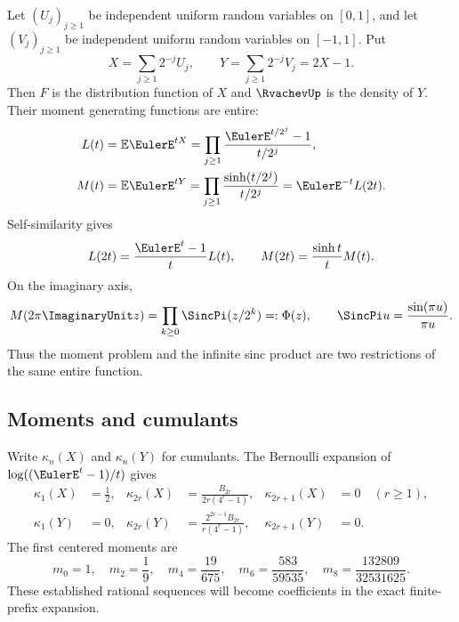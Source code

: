 \documentclass[11pt,oneside]{article}
\numberwithin{equation}{section}
\theoremstyle{definition}
\theoremstyle{remark}
\begin{document}
Let $(U_j)_{j\ge1}$ be independent uniform random variables on $[0,1]$, and let
$(V_j)_{j\ge1}$ be independent uniform random variables on $[-1,1]$.  Put
\begin{equation}
 X=\sum_{j\ge1}2^{-j}U_j,
 \qquad
 Y=\sum_{j\ge1}2^{-j}V_j=2X-1.
 \label{p2:eq:XY-series}
\end{equation}
Then $F$ is the distribution function of $X$ and $\RvachevUp$ is the density of $Y$.  Their moment
generating functions are entire:
\begin{align}
 L(t)&=\mathbb E\EulerE^{tX}
 =\prod_{j\ge1}\frac{\EulerE^{t/2^j}-1}{t/2^j},
 \label{p2:eq:L-def}\\
 M(t)&=\mathbb E\EulerE^{tY}
 =\prod_{j\ge1}\frac{\sinh(t/2^j)}{t/2^j}
 =\EulerE^{-t}L(2t).
 \label{p2:eq:M-def}
\end{align}
Self-similarity gives
\begin{equation}
 L(2t)=\frac{\EulerE^t-1}{t}L(t),
 \qquad
 M(2t)=\frac{\sinh t}{t}M(t).
 \label{p2:eq:mgf-refinement}
\end{equation}
On the imaginary axis,
\begin{equation}
 M(2\pi\ImaginaryUnit z)=\prod_{k\ge0}\SincPi(z/2^k)=:\Phi(z),
 \qquad \SincPi u=\frac{\sin(\pi u)}{\pi u}.
 \label{p2:eq:M-Phi}
\end{equation}
Thus the moment problem and the infinite sinc product are two restrictions of the same entire
function.

\subsection{Moments and cumulants}

Write $\kappa_n(X)$ and $\kappa_n(Y)$ for cumulants.  The Bernoulli expansion of
$\log((\EulerE^t-1)/t)$ gives
\begin{align}
 \kappa_1(X)&=\frac12,
 &\kappa_{2r}(X)&=\frac{B_{2r}}{2r(4^r-1)},
 &\kappa_{2r+1}(X)&=0\quad(r\ge1),
 \label{p2:eq:X-cumulants}\\
 \kappa_1(Y)&=0,
 &\kappa_{2r}(Y)&=\frac{2^{2r-1}B_{2r}}{r(4^r-1)},
 &\kappa_{2r+1}(Y)&=0.
 \label{p2:eq:Y-cumulants}
\end{align}
The first centered moments are
\begin{equation}
 m_0=1,
 \quad m_2=\frac19,
 \quad m_4=\frac{19}{675},
 \quad m_6=\frac{583}{59535},
 \quad m_8=\frac{132809}{32531625}.
 \label{p2:eq:Y-moments}
\end{equation}
These established rational sequences will become coefficients in the exact finite-prefix expansion.
\end{document}
